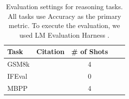 

\begin{table}[ht]
\centering
\caption{Evaluation settings for reasoning tasks. All tasks use Accuracy as the primary metric. To execute the evaluation, we used LM Evaluation Harness \cite{eval-harness}.}
\label{tab:reasoning-eval-settings}
\begin{tabular}{llccl}
\toprule
Task & Citation & \# of Shots \\
\midrule
GSM8k & ~\cite{cobbe2021training} &  4 \\
IFEval & ~\cite{zhou2023instruction} &  0 \\
MBPP & ~\cite{austin2021programsynthesislargelanguagen} & 4 \\
\bottomrule
\end{tabular}
\end{table}